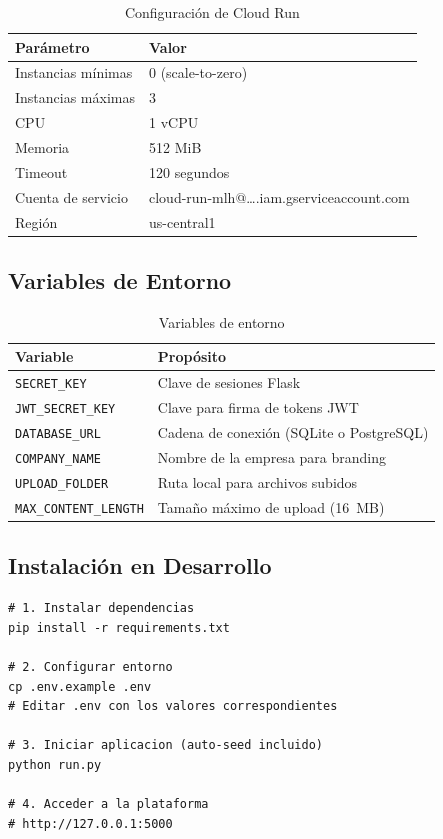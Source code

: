 \documentclass[12pt,a4paper]{article}
\begin{document}
\begin{table}[h!]
\centering
\begin{tabular}{ll}
\toprule
\textbf{Par\'ametro} & \textbf{Valor} \\
\midrule
Instancias m\'inimas & 0 (scale-to-zero) \\
Instancias m\'aximas & 3 \\
CPU                  & 1 vCPU \\
Memoria              & 512 MiB \\
Timeout              & 120 segundos \\
Cuenta de servicio   & cloud-run-mlh@\ldots.iam.gserviceaccount.com \\
Regi\'on             & us-central1 \\
\bottomrule
\end{tabular}
\caption{Configuraci\'on de Cloud Run}
\end{table}

\subsection{Variables de Entorno}

\begin{table}[h!]
\centering
\begin{tabular}{ll}
\toprule
\textbf{Variable} & \textbf{Prop\'osito} \\
\midrule
\texttt{SECRET\_KEY}          & Clave de sesiones Flask \\
\texttt{JWT\_SECRET\_KEY}     & Clave para firma de tokens JWT \\
\texttt{DATABASE\_URL}        & Cadena de conexi\'on (SQLite o PostgreSQL) \\
\texttt{COMPANY\_NAME}        & Nombre de la empresa para branding \\
\texttt{UPLOAD\_FOLDER}       & Ruta local para archivos subidos \\
\texttt{MAX\_CONTENT\_LENGTH} & Tama\~no m\'aximo de upload (16~MB) \\
\bottomrule
\end{tabular}
\caption{Variables de entorno}
\end{table}

\subsection{Instalaci\'on en Desarrollo}

\begin{lstlisting}[style=plain, caption={Pasos de instalaci\'on local}]
# 1. Instalar dependencias
pip install -r requirements.txt

# 2. Configurar entorno
cp .env.example .env
# Editar .env con los valores correspondientes

# 3. Iniciar aplicacion (auto-seed incluido)
python run.py

# 4. Acceder a la plataforma
# http://127.0.0.1:5000
\end{lstlisting}
\end{document}
